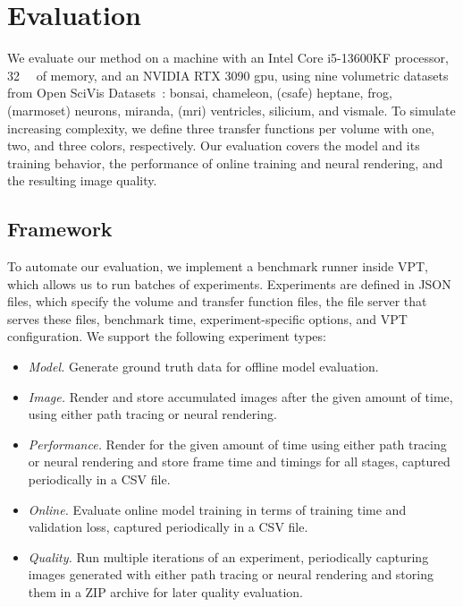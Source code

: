 \chapter{Evaluation}
\label{ch:evaluation}

We evaluate our method on a machine with an Intel Core i5-13600KF processor,
\qty{32}{\giga\byte} of memory, and an NVIDIA RTX 3090 \ac{gpu}, using nine
volumetric datasets from Open SciVis Datasets~\cite{mccormick_ome-zarr_2026}:
\textsf{bonsai}, \textsf{chameleon}, \textsf{(csafe) heptane}, \textsf{frog},
\textsf{(marmoset) neurons}, \textsf{miranda}, \textsf{(mri) ventricles},
\textsf{silicium}, and \textsf{vismale}. To simulate increasing complexity,
we define three transfer functions per volume with one, two, and three colors,
respectively. Our evaluation covers the model and its training behavior, the
performance of online training and neural rendering, and the resulting image
quality.

\section{Framework}

To automate our evaluation, we implement a benchmark runner inside VPT, which
allows us to run batches of experiments. Experiments are defined in JSON files,
which specify the volume and transfer function files, the file server that
serves these files, benchmark time, experiment-specific options, and VPT
configuration. We support the following experiment types:
\begin{itemize}
    \item \emph{Model.} Generate ground truth data for offline model evaluation.
    
    \item \emph{Image.} Render and store accumulated images after the given
    amount of time, using either path tracing or neural rendering.
    
    \item \emph{Performance.} Render for the given amount of time using either
    path tracing or neural rendering and store frame time and timings for all
    stages, captured periodically in a CSV file.
    
    \item \emph{Online.} Evaluate online model training in terms of training
    time and validation loss, captured periodically in a CSV file.
    
    \item \emph{Quality.} Run multiple iterations of an experiment, periodically 
    capturing images generated with either path tracing or neural rendering and
    storing them in a ZIP archive for later quality evaluation.
\end{itemize}

